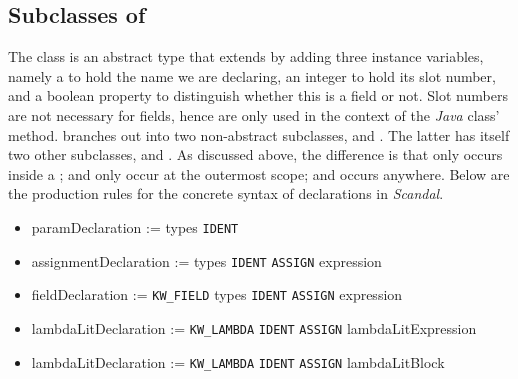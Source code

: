 \subsection{Subclasses of }

The class  is an abstract type that extends  by adding three instance variables, namely a  to hold the name we are declaring, an integer to hold its slot number, and a boolean property to distinguish whether this is a field or not. Slot numbers are not necessary for fields, hence are only used in the context of the \emph{Java} class'  method.  branches out into two non-abstract subclasses,  and . The latter has itself two other subclasses,  and . As discussed above, the difference is that  only occurs inside a ;  and  only occur at the outermost scope; and  occurs anywhere. Below are the production rules for the concrete syntax of declarations in \emph{Scandal}.

\begin{itemize}
	\item paramDeclaration := types \texttt{IDENT}
	\item assignmentDeclaration := types \texttt{IDENT} \texttt{ASSIGN} expression
	\item fieldDeclaration := \texttt{KW\_FIELD} types \texttt{IDENT} \texttt{ASSIGN} expression	
	\item lambdaLitDeclaration := \texttt{KW\_LAMBDA} \texttt{IDENT} \texttt{ASSIGN} lambdaLitExpression
	\item lambdaLitDeclaration := \texttt{KW\_LAMBDA} \texttt{IDENT} \texttt{ASSIGN} lambdaLitBlock
\end{itemize}

